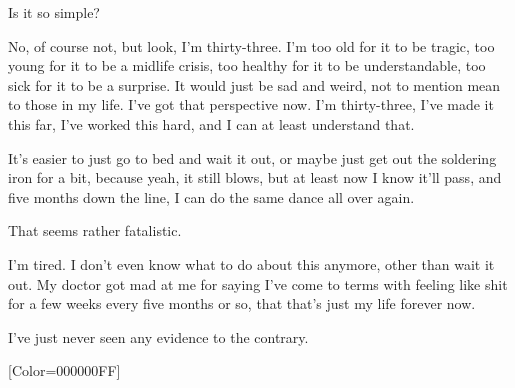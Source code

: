 \begin{paracol}{2}
\begin{leftcolumn}
\begin{ally}
Is it so simple?
\end{ally}
No, of course not, but look, I'm thirty-three. I'm too old for it to be tragic, too young for it to be a midlife crisis, too healthy for it to be understandable, too sick for it to be a surprise. It would just be sad and weird, not to mention mean to those in my life. I've got that perspective now. I'm thirty-three, I've made it this far, I've worked this hard, and I can at least understand that.

It's easier to just go to bed and wait it out, or maybe just get out the soldering iron for a bit, because yeah, it still blows, but at least now I know it'll pass, and five months down the line, I can do the same dance all over again.

\begin{ally}
That seems rather fatalistic.
\end{ally}
I'm tired. I don't even know what to do about this anymore, other than wait it out. My doctor got mad at me for saying I've come to terms with feeling like shit for a few weeks every five months or so, that that's just my life forever now.

I've just never seen any evidence to the contrary.
\newpage
\end{leftcolumn}
\end{paracol}
\resetbackgroundcolor

\renewfontfamily{}[Color=000000FF]
